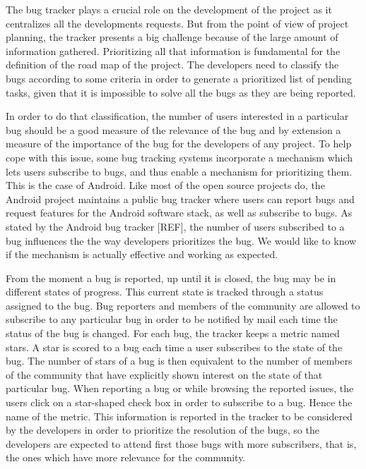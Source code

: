 \documentclass[10pt, conference, compsocconf]{IEEEtran}
\begin{document}
The bug tracker plays a crucial role on the development of the project as it centralizes all the developments requests. But from the point of view of project planning, the tracker presents a big challenge because of the large amount of information gathered. Prioritizing all that information is fundamental for the definition of the road map of the project. The developers need to classify the bugs according to some criteria in order to generate a prioritized list of pending tasks, given that it is impossible to solve all the bugs as they are being reported.

In order to do that classification, the number of users interested in a particular bug should be a good measure of the relevance of the bug and by extension a measure of the importance of the bug for the developers of any project. To help cope with this issue, some bug tracking systems incorporate a mechanism which lets users subscribe to bugs, and thus enable a mechanism for prioritizing them. This is the case of Android. Like most of the open source projects do, the Android project maintains a public bug tracker where users can report bugs and request features for the Android software stack, as well as subscribe to bugs. As stated by the Android bug tracker [REF], the number of users subscribed to a bug influences the the way developers prioritizes the bug. We would like to know if the mechanism is actually effective and working as expected.

From the moment a bug is reported, up until it is closed, the bug may be in different states of progress. This current state is tracked through a status assigned to the bug. Bug reporters and members of the community are allowed to subscribe to any particular bug in order to be notified by mail each time the status of the bug is changed.  For each bug, the tracker keeps a metric named stars. A star is scored to a bug each time a user subscribes to the state of the bug. The number of stars of a bug is then equivalent to the number of members of the community that have explicitly shown interest on the state of that particular bug. When reporting a bug or  while browsing the reported issues, the users click on a star-shaped check box in order to subscribe to a bug. Hence the name of the metric. This information is reported in the tracker to be considered by the developers in order to prioritize the resolution of the bugs, so the developers are expected to attend first those bugs with more subscribers, that is, the ones which have more relevance for the community.
\end{document}
